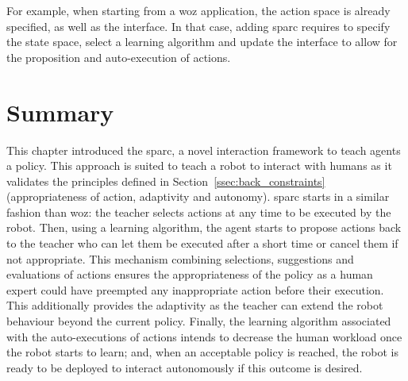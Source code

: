 For example, when starting from a \gls{woz} application, the action space is already specified, as well as the interface. In that case, adding \gls{sparc} requires to specify the state space, select a learning algorithm and update the interface to allow for the proposition and auto-execution of actions.

\section{Summary}

This chapter introduced the \acrfull{sparc}, a novel interaction framework to teach agents a policy. This approach is suited to teach a robot to interact with humans as it validates the principles defined in Section~\ref{ssec:back_constraints} (appropriateness of action, adaptivity and autonomy). \gls{sparc} starts in a similar fashion than \gls{woz}: the teacher selects actions at any time to be executed by the robot. Then, using a learning algorithm, the agent starts to propose actions back to the teacher who can let them be executed after a short time or cancel them if not appropriate. This mechanism combining selections, suggestions and evaluations of actions ensures the appropriateness of the policy as a human expert could have preempted any inappropriate action before their execution. This additionally provides the adaptivity as the teacher can extend the robot behaviour beyond the current policy. Finally, the learning algorithm associated with the auto-executions of actions intends to decrease the human workload once the robot starts to learn; and, when an acceptable policy is reached, the robot is ready to be deployed to interact autonomously if this outcome is desired.

